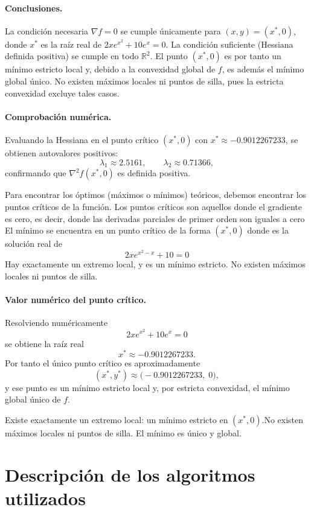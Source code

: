 \documentclass{article}
\begin{document}
\paragraph{Conclusiones.}
La condición necesaria $\nabla f=0$ se cumple únicamente para
  $(x,y)=(x^{*},0)$, donde $x^{*}$ es la raíz real de
  $2x e^{x^{2}} + 10 e^{x}=0$.
La condición suficiente (Hessiana definida positiva) se cumple en todo $\mathbb{R}^{2}$.
El punto $(x^{*},0)$ es por tanto un mínimo estricto local y, debido a la convexidad global de $f$, es además el mínimo global único. No existen máximos locales ni puntos de silla, pues la estricta convexidad excluye tales casos.


\paragraph{Comprobación numérica.}
Evaluando la Hessiana en el punto crítico $(x^{*},0)$ con
$x^{*}\approx -0.9012267233$, se obtienen autovalores positivos:
\[
\lambda_1 \approx 2.5161, \qquad \lambda_2 \approx 0.71366,
\]
confirmando que $\nabla^2 f(x^{*},0)$ es definida positiva.





Para encontrar los óptimos (máximos o mínimos) teóricos, debemos encontrar los puntos críticos de la función. Los puntos críticos son aquellos donde el gradiente es cero, es decir, donde las derivadas parciales de primer orden son iguales a cero
El mínimo se encuentra en un punto crítico de la forma 
$(x^{*},0)$ donde es la solución real de
\[
2x e^{x^{2}-x} + 10 = 0
\]
Hay exactamente un extremo local, y es un mínimo estricto. No existen máximos locales ni puntos de silla.


\paragraph{Valor numérico del punto crítico.}
Resolviendo numéricamente
\[
2x e^{x^{2}} + 10 e^{x} = 0
\]
se obtiene la raíz real
\[
x^{*}\approx -0.9012267233.
\]
Por tanto el único punto crítico es aproximadamente
\[
(x^{*},y^{*}) \approx \big(-0.9012267233,\;0\big),
\]
y ese punto es un mínimo estricto local y, por estricta convexidad, el mínimo global único de \(f\). 

Existe exactamente un extremo local: un mínimo estricto en \((x^{*},0)\).No existen máximos locales ni puntos de silla. El mínimo es único y global.



\section{Descripción de los algoritmos utilizados }
\end{document}
